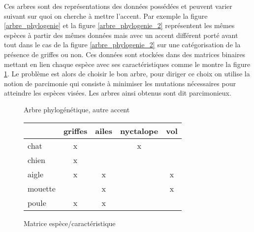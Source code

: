 Ces arbres sont des représentations des données possédées et peuvent varier suivant sur quoi on cherche à mettre l'accent. Par exemple la figure \ref{arbre_phylogenie} et la figure \ref{arbre_phylogenie_2} représentent les mêmes espèces à partir des mêmes données mais avec un accent différent porté avant tout dans le cas de la figure \ref{arbre_phylogenie_2} sur une catégorisation de la présence de griffes ou non. Ces données sont stockées dans des matrices binaires mettant en lien chaque espèce avec ses caractéristiques comme le montre la figure \ref{matrice_espece_carac}. Le problème est alors de choisir le bon arbre, pour diriger ce choix on utilise la notion de parcimonie qui consiste à minimiser les mutations nécessaires pour atteindre les espèces visées. Les arbres ainsi obtenus sont dit parcimonieux.

\begin{figure}[H]
	\begin{minipage}[c]{0.5\textwidth}
	\begin{center}
	\end{center}
	\caption{Arbre phylogénétique, autre accent}
	\label{arbre_phylogenie_2}
	\end{minipage}
	\begin{minipage}[c]{0.5\textwidth}
	\begin{center}
		\begin{tabular}{ l | c c c c }
			 & griffes & ailes & nyctalope & vol \\
			\hline
			chat & x & & x & \\
			chien & x & & & \\
			aigle & x & x & & x \\
			mouette & & x & & x \\
			poule & x & x & & \\
		\end{tabular}
	\end{center}
	\caption{Matrice espèce/caractéristique}
	\label{matrice_espece_carac}
	\end{minipage}
\end{figure}

